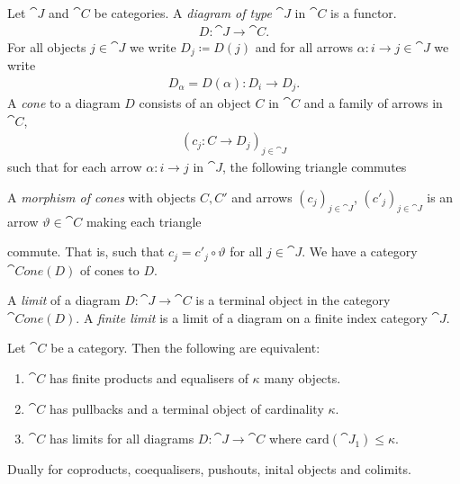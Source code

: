 \documentclass{article}
\begin{document}
\begin{definition}
	Let $\cat J$ and $\cat C$ be categories. A \emph{diagram of type} $\cat J$
	in $\cat C$ is a functor.
	\begin{align*}
		D:\cat J \to \cat C.
	\end{align*}
	For all objects $j\in\cat J$ we write $D_j\coloneqq D(j)$ and for all arrows
	$\alpha:i\to j\in\cat J$ we write
	\begin{align*}
		D_\alpha = D(\alpha):D_i\to D_j.
	\end{align*}
	A \emph{cone} to a diagram $D$ consists of an object $C$ in $\cat C$ and
	a family of arrows in $\cat C$,
	\begin{align*}
		\left(c_j:C\to D_j\right)_{j\in\cat J}
	\end{align*}
	such that for each arrow $\alpha:i\to j$ in $\cat J$,
	the following triangle commutes
	\begin{center}
	\end{center}
	A \emph{morphism of cones} with objects $C,C'$ and arrows
	$\left(c_j\right)_{j\in\cat J}$, $\left(c'_j\right)_{j\in\cat J}$
	is an arrow $\vartheta\in\cat C$ making each triangle
	\begin{center}
	\end{center}
	commute. That is, such that $c_j = c'_j \circ \vartheta$ for all $j\in\cat J$.
	We have a category $\cat{Cone}(D)$ of cones to $D$.
\end{definition}

\begin{definition}[Awodey p. 102]
	A \emph{limit} of a diagram $D:\cat J \to \cat C$ is a terminal object in the
	category $\cat{Cone}(D)$. A \emph{finite limit} is a limit of a diagram on
	a finite index category $\cat J$.
\end{definition}

\begin{proposition}[Awodey p. 105]
	Let $\cat C$ be a category. Then the following are equivalent:
	\begin{enumerate}
		\item $\cat C$ has finite products and equalisers of $\kappa$ many objects.
		\item $\cat C$ has pullbacks and a terminal object of cardinality $\kappa$.
		\item $\cat C$ has limits for all diagrams $D:\cat J\to\cat C$ where $\text{card}(\cat J_1)\leq \kappa$.
	\end{enumerate}
	Dually for coproducts, coequalisers, pushouts, inital objects and colimits.
\end{proposition}
\end{document}
